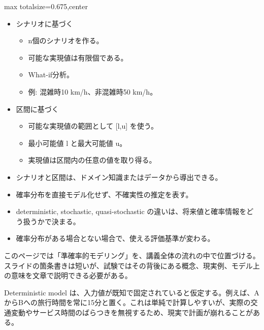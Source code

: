\clearpage
{}
\begin{adjustbox}{max totalsize={\textwidth}{0.675\textheight},center}
\begin{minipage}{\textwidth}\scriptsize
\begin{minipage}[t]{0.485\textwidth}
\begin{itemize}
\item シナリオに基づく
\begin{itemize}
\item n個のシナリオを作る。
\item 可能な実現値は有限個である。
\item What-if分析。
\item 例: 混雑時10 km/h、非混雑時50 km/h。
\end{itemize}
\item 区間に基づく
\begin{itemize}
\item 可能な実現値の範囲として [l,u] を使う。
\item 最小可能値 l と最大可能値 u。
\item 実現値は区間内の任意の値を取り得る。
\end{itemize}
\item シナリオと区間は、ドメイン知識またはデータから導出できる。
\item 確率分布を直接モデル化せず、不確実性の推定を表す。
\end{itemize}
\begin{itemize}
\item deterministic, stochastic, quasi-stochastic の違いは、将来値と確率情報をどう扱うかで決まる。
\item 確率分布がある場合とない場合で、使える評価基準が変わる。
\end{itemize}
\end{minipage}\hfill
\begin{minipage}[t]{0.485\textwidth}
このページでは「準確率的モデリング」を、講義全体の流れの中で位置づける。スライドの箇条書きは短いが、試験ではその背後にある概念、現実例、モデル上の意味を文章で説明できる必要がある。\par
Deterministic model は、入力値が既知で固定されていると仮定する。例えば、AからBへの旅行時間を常に15分と置く。これは単純で計算しやすいが、実際の交通変動やサービス時間のばらつきを無視するため、現実で計画が崩れることがある。\par

\end{minipage}
\end{minipage}
\end{adjustbox}
